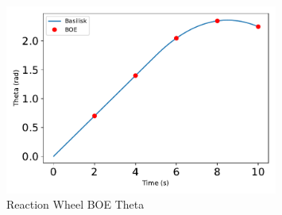 \begin{figure}[htbp]\centerline{\includegraphics[width=0.8\textwidth]{AutoTeX/ReactionWheelBOETheta}}\caption{Reaction Wheel BOE Theta}\label{fig:ReactionWheelBOETheta}\end{figure}